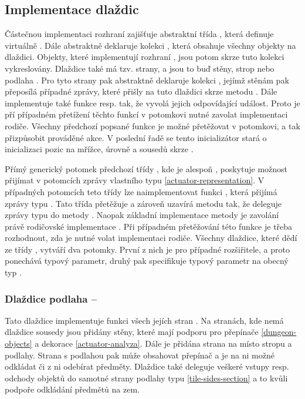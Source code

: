 \subsection{Implementace dlaždic}
Částečnou implementaci rozhraní  zajišťuje abstraktní třída , která definuje virtuálně .
Dále abstraktně deklaruje kolekci , která obsahuje všechny objekty na dlaždici. Objekty, které 
implementují rozhraní , jsou potom skrze tuto kolekci vykreslovány.
Dlaždice také má tzv. strany, a jsou to buď stěny, strop nebo podlaha .
Pro tyto strany pak abstraktně deklaruje kolekci , jejímž stěnám pak přeposílá
případné zprávy, které přišly na tuto dlaždici skrze metodu .
Dále implementuje také funkce  resp.  tak, že vyvolá jejich odpovídající událost.
Proto je pří případném přetížení těchto funkcí v potomkovi nutné zavolat implementaci rodiče. Všechny
předchozí popsané funkce je možné přetěžovat v potomkovi, a tak přizpůsobit prováděné akce.
V poslední řadě se tento inicializátor stará o inicializaci pozic na mřížce, úrovně a sousedů skrze . 


Přímý generický potomek předchozí třídy , kde  je alespoň ,
poskytuje možnost přijímat v potomcích zprávy vlastního typu \vref{actuator-representation}. V případných potomcích teto třídy 
lze naimplementovat funkci , která přijímá zprávy typu . Tato třída přetěžuje a zároveň 
uzavírá metodu  tak, že deleguje zprávy typu  do metody . 
Naopak základní implementace metody  je zavolání právě rodičovské implementace . 
Při případném přetěžování této funkce je třeba rozhodnout, zda je nutné volat implementaci rodiče. Všechny dlaždice,
které dědí ze třídy , vytváří dva potomky. První z nich je pro případné rozšiřitele,
a proto ponechává typový parametr, druhý pak specifikuje typový parametr na obecný typ .

\subsubsection{Dlaždice podlaha -- }
Tato dlaždice implementuje funkci všech jejích stran . Na stranách, kde
nemá dlaždice sousedy jsou přidány stěny, které mají podporu pro přepínače \vref{dungeon-objects} a dekorace \vref{actuator-analyza}.
Dále je přidána strana na místo stropu a podlahy. Strana s podlahou pak může obsahovat přepínač a je na ni možné odkládat
či z ni odebírat předměty. Dlaždice také deleguje veškeré vstupy resp. odchody objektů do samotné strany podlahy
typu  \vref{tile-sides-section} a to kvůli podpoře odkládání předmětů na zem.

